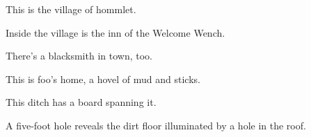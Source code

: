 \documentclass[10pt,twoside,twocolumn,openany,bg=full,nomultitoc]{dndbook}
\begin{document}
\label{sec:org5ba5a97}

This is the village of hommlet.

\label{sec:org93b54e4}

Inside the village is the inn of the Welcome Wench.

\label{sec:org8f38325}

There's a blacksmith in town, too.

\label{sec:orgad26bbf}

This is foo's home, a hovel of mud and sticks.

\label{sec:org77e64f2}

This ditch has a board spanning it.

\label{sec:org99a7b06}

A five-foot hole reveals the dirt floor illuminated by a hole in the roof.
\end{document}
